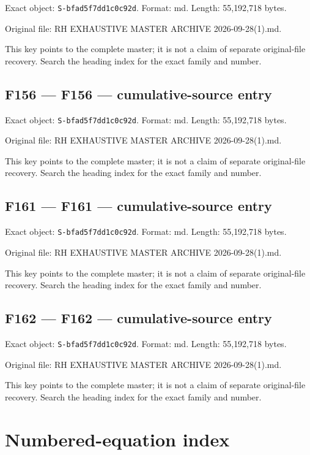 \documentclass[
  10pt,
  a4paper,
  10pt,
  oneside,
  openany]{book}
\begin{document}
Exact object: \texttt{S-bfad5f7dd1c0c92d}. Format: md. Length:
55,192,718 bytes.

Original file: RH EXHAUSTIVE MASTER ARCHIVE 2026-09-28(1).md.

This key points to the complete master; it is not a claim of separate
original-file recovery. Search the heading index for the exact family
and number.

\subsection{F156 --- F156 --- cumulative-source
entry}\label{source-f156}

Exact object: \texttt{S-bfad5f7dd1c0c92d}. Format: md. Length:
55,192,718 bytes.

Original file: RH EXHAUSTIVE MASTER ARCHIVE 2026-09-28(1).md.

This key points to the complete master; it is not a claim of separate
original-file recovery. Search the heading index for the exact family
and number.

\subsection{F161 --- F161 --- cumulative-source
entry}\label{source-f161}

Exact object: \texttt{S-bfad5f7dd1c0c92d}. Format: md. Length:
55,192,718 bytes.

Original file: RH EXHAUSTIVE MASTER ARCHIVE 2026-09-28(1).md.

This key points to the complete master; it is not a claim of separate
original-file recovery. Search the heading index for the exact family
and number.

\subsection{F162 --- F162 --- cumulative-source
entry}\label{source-f162}

Exact object: \texttt{S-bfad5f7dd1c0c92d}. Format: md. Length:
55,192,718 bytes.

Original file: RH EXHAUSTIVE MASTER ARCHIVE 2026-09-28(1).md.

This key points to the complete master; it is not a claim of separate
original-file recovery. Search the heading index for the exact family
and number.

\section{Numbered-equation index}\label{app-equations}
\end{document}
